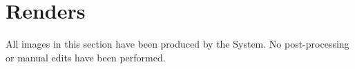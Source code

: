 \chapter{Renders}\label{appendix_renders}

All images in this section have been produced by the System. No post-processing or manual edits have been performed.